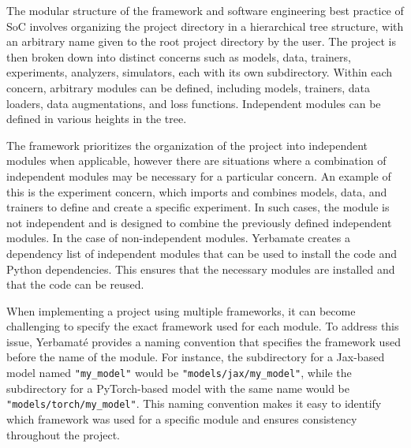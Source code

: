  The modular structure of the framework and software engineering best practice of SoC involves organizing the project directory in a hierarchical tree structure, with an arbitrary name given to the root project directory by the user. The project is then broken down into distinct concerns such as models, data, trainers, experiments, analyzers, simulators, each with its own subdirectory. Within each concern, arbitrary modules can be defined, including models, trainers, data loaders, data augmentations, and loss functions. Independent modules can be defined in various heights in the tree.

The framework prioritizes the organization of the project into independent modules when applicable, however there are situations where a combination of independent modules may be necessary for a particular concern. An example of this is the experiment concern, which imports and combines models, data, and trainers to define and create a specific experiment. In such cases, the module is not independent and is designed to combine the previously defined independent modules. 
In the case of non-independent modules. 
Yerbamate creates a dependency list of independent modules that can be used to install the code and Python dependencies. This ensures that the necessary modules are installed and that the code can be reused. 

When implementing a project using multiple frameworks, it can become challenging to specify the exact framework used for each module. To address this issue, Yerbamaté provides a naming convention that specifies the framework used before the name of the module. For instance, the subdirectory for a Jax-based model named \texttt{"my\_model"} would be \texttt{"models/jax/my\_model"}, while the subdirectory for a PyTorch-based model with the same name would be \texttt{"models/torch/my\_model"}. This naming convention makes it easy to identify which framework was used for a specific module and ensures consistency throughout the project.





